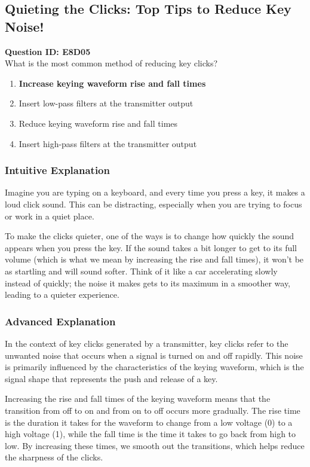 \subsection{Quieting the Clicks: Top Tips to Reduce Key Noise!}

\begin{tcolorbox}
    \textbf{Question ID: E8D05} \\
    What is the most common method of reducing key clicks? \\
    \begin{enumerate}[label=\Alph*.]
        \item \textbf{Increase keying waveform rise and fall times}
        \item Insert low-pass filters at the transmitter output
        \item Reduce keying waveform rise and fall times
        \item Insert high-pass filters at the transmitter output
    \end{enumerate}
\end{tcolorbox}

\subsubsection{Intuitive Explanation}
Imagine you are typing on a keyboard, and every time you press a key, it makes a loud click sound. This can be distracting, especially when you are trying to focus or work in a quiet place. 

To make the clicks quieter, one of the ways is to change how quickly the sound appears when you press the key. If the sound takes a bit longer to get to its full volume (which is what we mean by increasing the rise and fall times), it won’t be as startling and will sound softer. Think of it like a car accelerating slowly instead of quickly; the noise it makes gets to its maximum in a smoother way, leading to a quieter experience.

\subsubsection{Advanced Explanation}
In the context of key clicks generated by a transmitter, key clicks refer to the unwanted noise that occurs when a signal is turned on and off rapidly. This noise is primarily influenced by the characteristics of the keying waveform, which is the signal shape that represents the push and release of a key.

Increasing the rise and fall times of the keying waveform means that the transition from off to on and from on to off occurs more gradually. The rise time is the duration it takes for the waveform to change from a low voltage (0) to a high voltage (1), while the fall time is the time it takes to go back from high to low. By increasing these times, we smooth out the transitions, which helps reduce the sharpness of the clicks.

